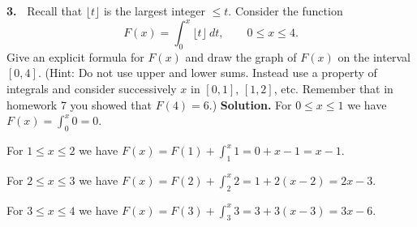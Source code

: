 \documentclass[12pt]{article}
\theoremstyle{definition}
\theoremstyle{remark}
\theoremstyle{definition}
\newenvironment{Solution}{\noindent\textbf{Solution.}}{}
\begin{document}
\vskip10pt 
{\bf 3.\ } Recall that $\lfloor t\rfloor$ is the largest integer $\leq t$. Consider the function 
\[F(x)=\int_0^x\lfloor t\rfloor\ dt,\qquad 0\leq x\leq 4.\]
Give an explicit formula for $F(x)$ and draw the graph of $F(x)$ on the interval $[0,4]$. 
\newline
(Hint: Do not use upper and lower sums. Instead use a property of integrals and consider  successively $x$ in $[0,1]$, $[1,2]$, etc. Remember that in homework 7 you showed that $F(4)=6$.)
\begin{Solution}
For $0\leq x\leq 1$ we have $F(x)=\displaystyle{\int_0^x0}=0$.

For $1\leq x\leq 2$ we have $F(x)=\displaystyle{F(1)+\int_1^x 1}=0+x-1=x-1$.

For $2\leq x\leq 3$ we have $F(x)=\displaystyle{F(2)+\int_2^x 2}=1+2(x-2)=2x-3$.

For $3\leq x\leq 4$ we have $F(x)=\displaystyle{F(3)+\int_3^x 3}=3+3(x-3)=3x-6$.


\end{Solution}

\begin{center}
\end{center}
\end{document}
